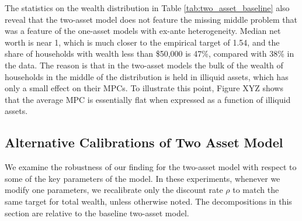 The statistics on the wealth distribution in Table \ref{tab:two_asset_baseline} also reveal that the two-asset model does not feature the missing middle problem that was a feature of the one-asset models with ex-ante heterogeneity. Median net worth is near 1, which is much closer to the empirical target of 1.54, and the share of households with wealth less than \$50,000 is 47\%, compared with 38\% in the data. The reason is that in the two-asset models the bulk of the wealth of households in the middle of the distribution is held in illiquid assets, which has only a small effect on their MPCs. To illustrate this point, Figure XYZ shows that the average MPC is essentially flat when expressed as a function of illiquid assets.

\subsection{Alternative Calibrations of Two Asset Model}
We examine the robustness of our finding for the two-asset model with respect to some of the key parameters of the model. In these experiments, whenever we modify one parameters, we recalibrate only the discount rate $\rho$ to match the same target for total wealth, unless otherwise noted. The decompositions in this section are relative to the baseline two-asset model. 

